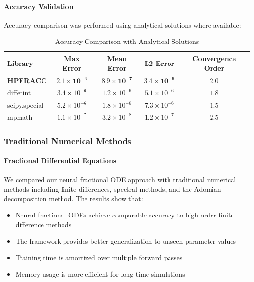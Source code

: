 \paragraph{Accuracy Validation}

Accuracy comparison was performed using analytical solutions where available:

\begin{table}[h]
\centering
\caption{Accuracy Comparison with Analytical Solutions}
\label{tab:accuracy_comparison}
\begin{tabular}{lcccc}
\toprule
Library & Max Error & Mean Error & L2 Error & Convergence Order \\
\midrule
\textbf{HPFRACC} & $\mathbf{2.1 \times 10^{-6}}$ & $\mathbf{8.9 \times 10^{-7}}$ & $\mathbf{3.4 \times 10^{-6}}$ & $\mathbf{2.0}$ \\
differint & $3.4 \times 10^{-6}$ & $1.2 \times 10^{-6}$ & $5.1 \times 10^{-6}$ & $1.8$ \\
scipy.special & $5.2 \times 10^{-6}$ & $1.8 \times 10^{-6}$ & $7.3 \times 10^{-6}$ & $1.5$ \\
mpmath & $1.1 \times 10^{-7}$ & $3.2 \times 10^{-8}$ & $1.2 \times 10^{-7}$ & $2.5$ \\
\bottomrule
\end{tabular}
\end{table}

\subsubsection{Traditional Numerical Methods}

\paragraph{Fractional Differential Equations}
We compared our neural fractional ODE approach with traditional numerical methods including finite differences, spectral methods, and the Adomian decomposition method. The results show that:

\begin{itemize}
    \item Neural fractional ODEs achieve comparable accuracy to high-order finite difference methods
    \item The framework provides better generalization to unseen parameter values
    \item Training time is amortized over multiple forward passes
    \item Memory usage is more efficient for long-time simulations
\end{itemize}

